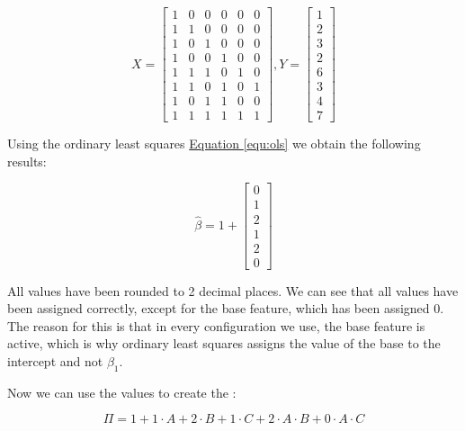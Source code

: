 \begin{displaymath}
    \textit{X} = 
    \begin{bmatrix} 
        1 & 0 & 0 & 0 & 0 & 0 \\
        1 & 1 & 0 & 0 & 0 & 0 \\
        1 & 0 & 1 & 0 & 0 & 0 \\
        1 & 0 & 0 & 1 & 0 & 0 \\
        1 & 1 & 1 & 0 & 1 & 0 \\
        1 & 1 & 0 & 1 & 0 & 1 \\
        1 & 0 & 1 & 1 & 0 & 0 \\
        1 & 1 & 1 & 1 & 1 & 1 
      \end{bmatrix}
      ,
      \textit{Y} =
      \begin{bmatrix}
        1 \\
        2 \\
        3 \\
        2 \\
        6 \\
        3 \\
        4 \\
        7 
      \end{bmatrix}
\end{displaymath}


Using the ordinary least squares \hyperref[equ:ols]{Equation \ref*{equ:ols}}  we obtain the following results:

\begin{equation}
    \hat{\beta} = 1 + 
    \begin{bmatrix}
        0 \\
        1 \\
        2 \\
        1 \\
        2 \\
        0
    \end{bmatrix}
\end{equation}

All values have been rounded to 2 decimal places. 
We can see that all values have been assigned correctly, except for the base feature, which has been assigned 0. The reason for this is that in every
configuration we use, the base feature is active, which is why ordinary least squares assigns the value of the base to the intercept and not $\beta_1$. 

Now we can use the values to create the \perfInfluenceModel:

\begin{equation}
    \Pi = 1 + 1 \cdot A + 2 \cdot B + 1 \cdot C + 2 \cdot A \cdot B + 0 \cdot A \cdot C
\end{equation}

